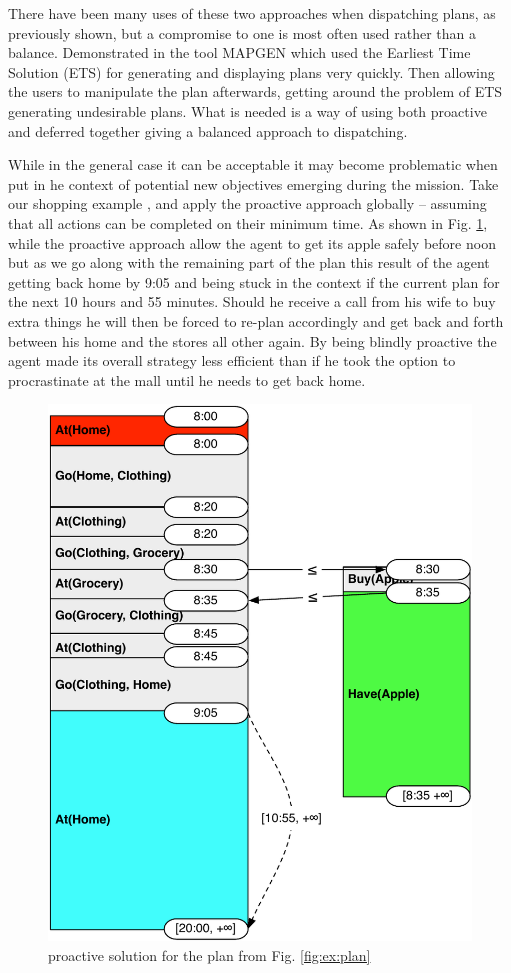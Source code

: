 There
have been many uses of these two approaches when dispatching plans, as
previously shown, but a compromise to one is most often used rather than
a balance. Demonstrated in the tool MAPGEN \cite{bresina03} which used
the Earliest Time Solution (ETS) for generating and displaying plans
very quickly. Then allowing the users to manipulate the plan afterwards,
getting around the problem of ETS generating undesirable plans. What is
needed is a way of using both proactive and deferred together giving a
balanced approach to dispatching.

While in the general case it can be acceptable it
may become problematic when put in he context of potential new
objectives emerging during the mission.  Take our shopping example ,
and apply the proactive approach globally -- assuming that all actions
can be completed on their minimum time.  As shown in 
Fig. \ref{fig:ex:proactive}, while the proactive approach allow the
agent to get its apple safely before noon but as we go along with the
remaining part of the plan this  result of the agent getting back home
by 9:05 and being stuck in the context if the current plan for the
next 10 hours and 55 minutes. Should he receive a call from his wife
to buy extra things he will then be forced to re-plan accordingly and
get back and forth between his home and the stores all other
again. By being blindly proactive the agent made its overall strategy
less efficient than if he took the option to procrastinate at the mall
until he needs to get back home. 


\begin{figure}
  \centering
  \includegraphics[width=0.8\columnwidth]{figs/example_early}
  \caption{proactive solution for the plan from Fig. \ref{fig:ex:plan}}
  \label{fig:ex:proactive}
\end{figure}

